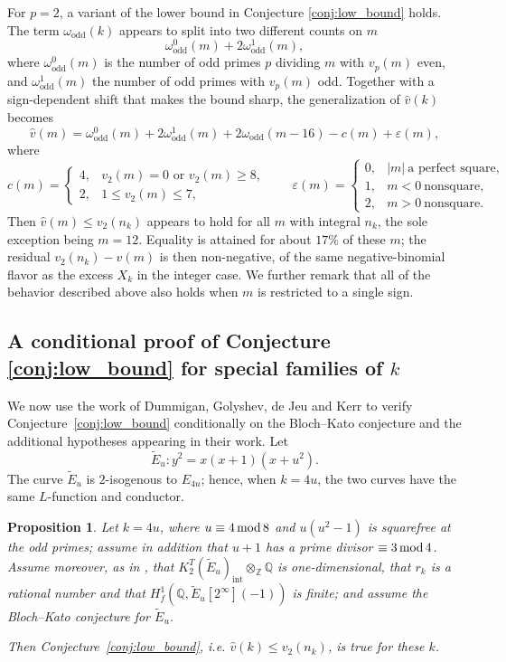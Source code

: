 \documentclass[12pt]{amsart}%
\renewcommand{\pmod}[1]{\hspace{0.05em}(\mathrm{mod}\,#1)}
\newcommand{\1}{\mathds{1}}
\renewcommand{\pmod}[1]{\,{\rm mod}\,#1}
\newtheorem{prop}[thm]{Proposition}
\theoremstyle{definition}
\numberwithin{equation}{section}
\numberwithin{table}{section}
\numberwithin{figure}{section}
\begin{document}
For $p=2$, a variant of the lower bound in Conjecture \ref{conj:low_bound} holds. The
term $\omega_{\text{odd}}(k)$ appears to split into two different counts on $m$
\[
\omega^0_{\text{odd}}(m) + 2 \omega_{\text{odd}}^1(m),
\]
where $\omega^0_{\text{odd}}(m)$ is the number of odd primes $p$ dividing $m$ with
$v_p(m)$ even, and $\omega^1_{\text{odd}}(m)$ the number of odd primes with $v_p(m)$ odd.
Together with a sign-dependent shift that makes the bound sharp, the generalization of
$\hat{v}(k)$ becomes
\[
\hat{v}(m) = \omega^0_{\text{odd}}(m) + 2 \omega^1_{\text{odd}}(m)
             + 2 \omega_{\text{odd}}(m - 16) - c(m) + \varepsilon(m),
\]
where
\[
c(m) =
  \begin{cases}
    4, & v_2(m) = 0 \text{ or } v_2(m) \geq 8, \\
    2, & 1 \leq v_2(m) \leq 7,
  \end{cases}
\qquad
\varepsilon(m) =
  \begin{cases}
    0, & |m|\ \text{a perfect square},\\
    1, & m<0\ \text{nonsquare},\\
    2, & m>0\ \text{nonsquare}.
  \end{cases}
\]
Then $\hat{v}(m) \leq v_2(n_k)$ appears to hold for all $m$ with integral $n_k$, the sole
exception being $m=12$. Equality   is attained for about $17\%$ of these $m$; the
residual $v_2(n_k) - \hat{v}(m)$ is then non-negative, of the same negative-binomial
flavor as the excess $X_k$ in the integer case. We further remark
that all of the behavior described above also holds when $m$ is restricted to a single sign.


\subsection{A conditional proof of Conjecture \ref{conj:low_bound} for special families of $k$}
\label{ssec:lowboundproof}
We now use the work of Dummigan, Golyshev, de Jeu and Kerr
\cite{DGJK} to verify Conjecture~\ref{conj:low_bound} conditionally
on the Bloch--Kato conjecture and the additional hypotheses appearing
in their work.  Let
\[
\widetilde E_u\colon y^2=x(x+1)(x+u^2).
\]
The curve $\widetilde E_u$ is $2$-isogenous to $E_{4u}$; hence, when
$k=4u$, the two curves have the same $L$-function and conductor.
\begin{prop}
\label{deJeuprop}
        Let $k = 4 u$, where $u \equiv 4 \pmod 8$ and $u(u^2-1)$ is squarefree at the odd primes; assume in addition that $u+1$ has a prime divisor $\equiv 3 \pmod 4$.
            Assume moreover,
as in \cite[Thm.~3]{DGJK}, that $K_2^T(\tilde E_u)_{\mathrm{int}}\otimes_{\mathbb Z}\mathbb Q$
is one-dimensional, that $r_k$ is a rational number and that $H^1_f(\mathbb Q,\tilde E_u[2^\infty](-1))$ is finite;
and assume the Bloch--Kato conjecture for $\tilde E_u$.

Then Conjecture~\ref{conj:low_bound}, i.e. $\hat v(k)\le v_2(n_k)$, is true for these $k$.
    \end{prop}
\end{document}
